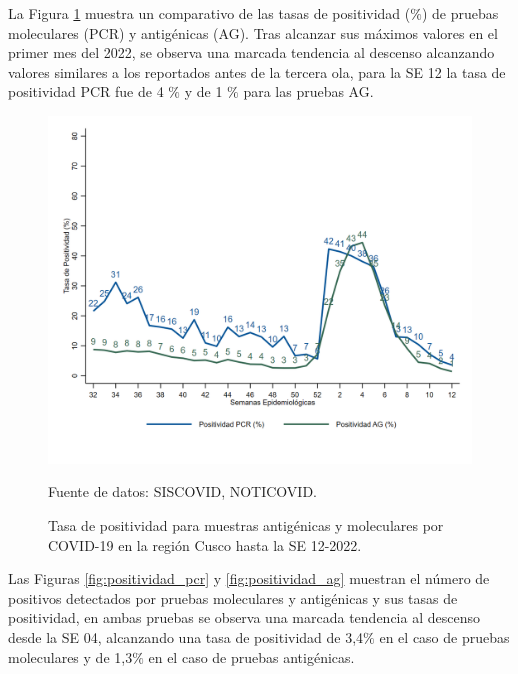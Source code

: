\documentclass[12pt,a4paper,openany]{book}
\begin{document}
  La Figura \ref{fig:total_muestras_procesada} muestra un comparativo de las tasas de positividad ($\%$) de pruebas moleculares (PCR) y antigénicas (AG). Tras alcanzar sus máximos valores en el primer mes del 2022, se observa una marcada tendencia al descenso alcanzando valores similares a los reportados antes de la tercera ola, para la SE 12 la tasa de positividad PCR fue de 4 $\%$ y de 1 $\%$ para las pruebas AG.
  
   \begin{figure}[h]
	\caption{Tasa de positividad para muestras antigénicas y moleculares por COVID-19 en la región Cusco hasta la SE 12-2022. }\label{fig:total_muestras_procesada}
	\begin{center}
		\includegraphics[width=0.75\linewidth]{../figuras/positividad_diaria_2021_2022.png}
	\end{center}
	{\footnotesize {Fuente de datos: SISCOVID, NOTICOVID.}}
\end{figure}


Las Figuras \ref{fig:positividad_pcr} y \ref{fig:positividad_ag} muestran el número de positivos detectados por pruebas moleculares y antigénicas y sus tasas de positividad, en ambas pruebas se observa una marcada tendencia al descenso desde la SE 04, alcanzando una tasa de positividad de 3,4$\%$ en el caso de pruebas moleculares y de 1,3$\%$ en el caso de pruebas antigénicas. 
\end{document}
